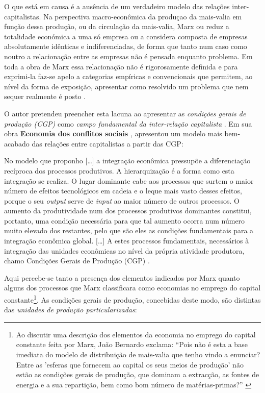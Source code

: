 \begin{citacao}
O que está em causa é a ausência de um verdadeiro modelo das relações inter-capitalistas. Na perspectiva macro-econômica da produçao da mais-valia em função dessa produção, ou da circulação da mais-valia, Marx ou reduz a totalidade económica a uma só empresa ou a considera composta de empresas absolutamente idênticas e indiferenciadas, de forma que tanto num caso como noutro a relacionação entre as empresas não é pensada enquanto problema. Em toda a obra de Marx essa relacionação não é rigorosamente definida e para exprimi-la faz-se apelo a categorias empíricas e convencionais que permitem, ao nível da forma de exposição, apresentar como resolvido um problema que nem sequer realmente é posto \cite[p.~21]{BERNARDO1977b}.
\end{citacao}

O autor pretendeu preencher esta lacuna ao apresentar as \textit{condições gerais de produção (CGP)} como \textit{campo fundamental da inter-relação capitalista} \cite[p.~110-115]{BERNARDO1977b}. Em sua obra \textbf{Economia dos conflitos sociais} \cite{BERNARDO1991}, apresentou um modelo mais bem-acabado das relações entre capitalistas a partir das CGP:

\begin{citacao}
No modelo que proponho [\dots] a integração econômica pressupõe a diferenciação recíproca dos processos produtivos. A hierarquização é a forma como esta integração se realiza. O lugar dominante cabe aos processos que surtem o maior número de efeitos tecnológicos em cadeia e o leque mais vasto desses efeitos, porque o seu \textit{output} serve de \textit{input} ao maior número de outros processos. O aumento da produtividade num dos processos produtivos dominantes constitui, portanto, uma condição necessária para que tal aumento ocorra num número muito elevado dos restantes, pelo que são eles as condições fundamentais para a integração econômica global. [\dots] A estes processos fundamentais, necessários à integração das unidades econômicas no nível da própria atividade produtora, chamo Condições Gerais de Produção (CGP) \cite[p.~157-158]{BERNARDO1991}.
\end{citacao}

Aqui percebe-se tanto a presença dos elementos indicados por Marx quanto alguns dos processos que Marx classificara como economias no emprego do capital constante\footnote{Ao discutir uma descrição dos elementos da economia no emprego do capital constante feita por Marx, João Bernardo exclama: ``Pois não é esta a base imediata do modelo de distribuição de mais-valia que tenho vindo a enunciar? Entre as 'esferas que fornecem ao capital os seus meios de produção' não estão as condições gerais de produção, que dominam a extracção, as fontes de energia e a sua repartição, bem como bom número de matérias-primas?'' \cite[p.~114]{BERNARDO1977b}}. As condições gerais de produção, concebidas deste modo, são distintas das \textit{unidades de produção particularizadas}:

